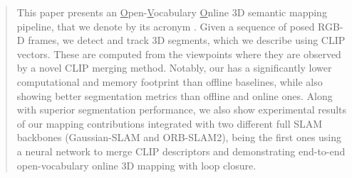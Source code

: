 \begin{abstract}
This paper presents an \underline{O}pen-\underline{V}ocabulary \underline{O}nline 3D semantic mapping pipeline, that we denote by its acronym \ours. 
Given a sequence of posed RGB-D frames, we detect and track 3D segments, which we describe using CLIP vectors. These are computed from the viewpoints where they are observed by a novel CLIP merging method. Notably, our \ours has a significantly lower computational and memory footprint than offline baselines, while also showing better segmentation metrics than offline and online ones. Along with superior segmentation performance, we also show experimental results of our mapping contributions integrated with two different full SLAM backbones (Gaussian-SLAM and ORB-SLAM2), being the first ones using a neural network to merge CLIP descriptors and demonstrating end-to-end open-vocabulary online 3D mapping with loop closure.
\end{abstract}
